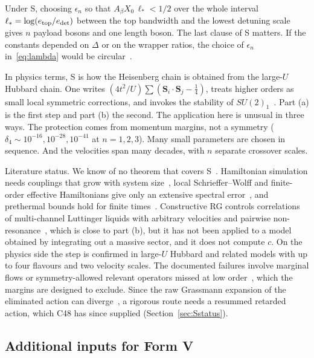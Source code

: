 \documentclass[11pt]{article}
\theoremstyle{definition}
\begin{document}
Under S, choosing $\epsilon_n$ so that $A_\beta X_0\,\ell_*<1/2$ over the whole interval $\ell_*=\log(e_{\rm top}/e_{\rm det})$ between the top bandwidth and the lowest detuning scale gives $n$ payload bosons and one length boson. The last clause of S matters. If the constants depended on $\Delta$ or on the wrapper ratios, the choice of $\epsilon_n$ in~\eqref{eq:lambda} would be circular~\cite{refC44}.

In physics terms, S is how the Heisenberg chain is obtained from the large-$U$ Hubbard chain. One writes $(4t^2/U)\sum(\mathbf S_i\cdot\mathbf S_j-\tfrac14)$, treats higher orders as small local symmetric corrections, and invokes the stability of $SU(2)_1$~\cite{OgataShiba}. Part (a) is the first step and part (b) the second. The application here is unusual in three ways. The protection comes from momentum margins, not a symmetry ($\delta_4\sim10^{-16},10^{-28},10^{-41}$ at $n=1,2,3$). Many small parameters are chosen in sequence. And the velocities span many decades, with $n$ separate crossover scales.

Literature status. We know of no theorem that covers S~\cite{litIR}. Hamiltonian simulation needs couplings that grow with system size~\cite{CMP,KPBC}, local Schrieffer--Wolff and finite-order effective Hamiltonians give only an extensive spectral error~\cite{BDL,DFF}, and prethermal bounds hold for finite times~\cite{YinLucas}. Constructive RG controls correlations of multi-channel Luttinger liquids with arbitrary velocities and pairwise non-resonance~\cite{BFM,MP,PSS}, which is close to part (b), but it has not been applied to a model obtained by integrating out a massive sector, and it does not compute $c$. On the physics side the step is confirmed in large-$U$ Hubbard and related models with up to four flavours and two velocity scales. The documented failures involve marginal flows or symmetry-allowed relevant operators missed at low order~\cite{ItoiKato,OshikawaAffleck}, which the margins are designed to exclude. Since the raw Grassmann expansion of the eliminated action can diverge~\cite{C46}, a rigorous route needs a resummed retarded action, which C48 has since supplied (Section~\ref{sec:Sstatus}).

\subsection{Additional inputs for Form V}
\end{document}
